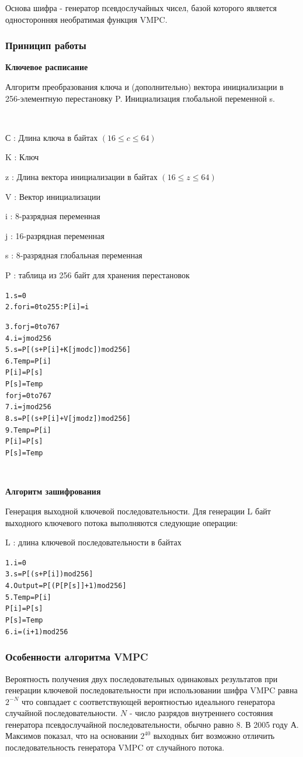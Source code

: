 \documentclass[a4paper]{report}
\begin{document}
Основа шифра - генератор псевдослучайных чисел, базой которого является односторонняя необратимая функция VMPC.

\subsubsection{Приницип работы}

\textbf{Ключевое расписание}

Алгоритм преобразования ключа и (дополнительно) вектора инициализации в 256-элементную перестановку P. Инициализация глобальной переменной s.

~

С : Длина ключа в байтах $(16\leq c\leq 64)$ 

K : Ключ 

z : Длина вектора инициализации в байтах $(16\leq z\leq 64)$ 

V : Вектор инициализации 

i : 8-разрядная переменная 

j : 16-разрядная переменная 

s : 8-разрядная глобальная переменная 

P : таблица из 256 байт для хранения перестановок 

\begin{alltt}
1.  s = 0
2.  for i = 0 to 255: P[i] = i

3.  for j = 0 to 767 
	4.  i = j mod 256
	5.  s = P[(s + P[i] + K[j mod c]) mod 256]
	6.  Temp = P[i]
  	    P[i] = P[s]
  	    P[s] = Temp
	for j = 0 to 767 
7.  i = j mod 256
8.  s = P[(s + P[i] + V[j mod z]) mod 256]
9. Temp = P[i]
    P[i] = P[s]
    P[s] = Temp
\end{alltt}
 
~

\textbf{Алгоритм зашифрования}

Генерация выходной ключевой последовательности.
Для генерации L байт выходного ключевого потока выполняются следующие операции: 

L : длина ключевой последовательности в байтах

\begin{alltt}
1. i = 0
	3. s = P[(s + P[i]) mod 256]
	4. Output = P[(P[P[s]] + 1) mod 256]
	5. Temp = P[i]
  	   P[i] = P[s]
  	   P[s] = Temp
	6. i = (i + 1) mod 256
\end{alltt}

\subsubsection{Особенности алгоритма VMPC}
Вероятность получения двух последовательных одинаковых результатов при генерации ключевой последовательности при использовании шифра VMPC равна $2^{-N}$ что совпадает с соответствующей вероятностью идеального генератора случайной последовательности.  $N$ -  число разрядов внутреннего состояния генератора псевдослучайной последовательности, обычно равно $8$. В 2005 году А. Максимов показал, что на основании $2^{40}$ выходных бит возможно отличить последовательность генератора VMPC от случайного потока.
\end{document}
